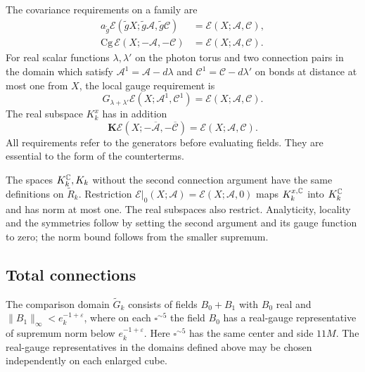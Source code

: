 The covariance requirements on a family are
\begin{equation}\label{eq:rg-activity-symmetries}
 \begin{split}
 a_{\tilde g}\mathscr E(\tilde gX;\tilde g\mathscr A,
                                      \tilde g\mathscr C)
                                  &=\mathscr E(X;\mathscr A,\mathscr C),\\
 \mathrm{Cg}\,\mathscr E(X;-\mathscr A,-\mathscr C)
                                  &=\mathscr E(X;\mathscr A,\mathscr C).
 \end{split}
\end{equation}
For real scalar functions $\lambda,\lambda'$ on the photon torus
and two connection pairs in the domain
which satisfy $\mathscr A^1=\mathscr A-d\lambda$ and
$\mathscr C^1=\mathscr C-d\lambda'$ on bonds at distance at
most one from $X$, the local gauge requirement is
\[
 G_{\lambda+\lambda'}\mathscr E(X;\mathscr A^1,\mathscr C^1)
                               =\mathscr E(X;\mathscr A,\mathscr C).
\]
The real subspace $K_k^x$ has in addition
\[
 \mathbf K\mathscr E(X;-\overline{\mathscr A},-\overline{\mathscr C})
                               =\mathscr E(X;\mathscr A,\mathscr C).
\]
All requirements refer to the generators before evaluating fields.
They are essential to the form of the counterterms.

The spaces $K_k^\mathbb C,K_k$ without the second connection argument
have the same definitions on $\widetilde R_k$. Restriction
$\mathscr E|_0(X;\mathscr A)=\mathscr E(X;\mathscr A,0)$ maps
$K_k^{x,\mathbb C}$ into $K_k^\mathbb C$ and has norm at most one. The real
subspaces also restrict. Analyticity, locality and the symmetries
follow by setting the second argument and its gauge function to
zero; the norm bound follows from the smaller supremum.

\subsection{Total connections}
\label{subsec:rg-total-connection-domain}

The comparison domain $\widetilde G_k$ consists of fields $B_0+B_1$
with $B_0$ real and $\|B_1\|_\infty<e_k^{-1+\varepsilon}$,
where on each $\square^{\sim5}$ the field $B_0$ has a real-gauge
representative of supremum norm below $e_k^{-1+\varepsilon}$.
Here $\square^{\sim5}$ has the same center and side $11M$.
The real-gauge representatives in the domains defined above may
be chosen independently on each enlarged cube.

